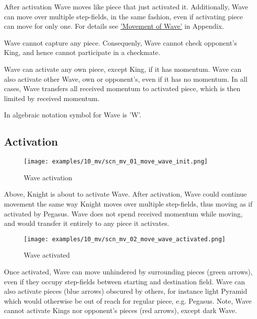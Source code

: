 After activation Wave moves like piece that just activated it. Additionally,
Wave can move over multiple step-fields, in the same fashion, even if
activating piece can move for only one. For details see
\hyperref[sec:Appendix/Movement of Wave]{'Movement of Wave'} in Appendix.

Wave cannot capture any piece. Consequenly, Wave cannot check opponent's
King, and hence cannot participate in a checkmate.

Wave can activate any own piece, except King, if it has momentum. Wave can
also activate other Wave, own or opponent's, even if it has no momentum. In
all cases, Wave transfers all received momentum to activated piece, which is
then limited by received momentum.

In algebraic notation symbol for Wave is 'W'.

\clearpage %

\subsection*{Activation}

\noindent
\begin{figure}[h]
\texttt{[image: examples/10\_mv/scn\_mv\_01\_move\_wave\_init.png]}
\caption{Wave activation}
\label{fig:scn_mv_01_move_wave_init}
\end{figure}

Above, Knight is about to activate Wave. After activation, Wave could
continue movement the same way Knight moves over multiple step-fields,
thus moving as if activated by Pegasus. Wave does not spend received
momentum while moving, and would transfer it entirely to any piece it
activates.

\clearpage %

\noindent
\begin{figure}[h]
\texttt{[image: examples/10\_mv/scn\_mv\_02\_move\_wave\_activated.png]}
\caption{Wave activated}
\label{fig:scn_mv_02_move_wave_activated}
\end{figure}

Once activated, Wave can move unhindered by surrounding pieces (green arrows),
even if they occupy step-fields between starting and destination field. Wave
can also activate pieces (blue arrows) obscured by others, for instance light
Pyramid which would otherwise be out of reach for regular piece, e.g. Pegasus.
Note, Wave cannot activate Kings nor opponent's pieces (red arrows), except
dark Wave.

